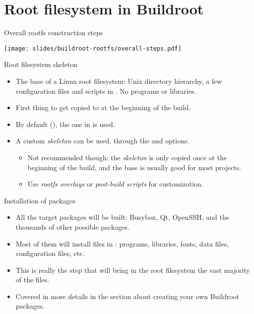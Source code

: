 
\section{Root filesystem in Buildroot}

\begin{frame}{Overall rootfs construction steps}
  \begin{center}
    \texttt{[image: slides/buildroot-rootfs/overall-steps.pdf]}
  \end{center}
\end{frame}

\begin{frame}{Root filesystem skeleton}
  \begin{itemize}
  \item The base of a Linux root filesystem: Unix directory hierarchy,
    a few configuration files and scripts in . No programs
    or libraries.
  \item First thing to get copied to  at the
    beginning of the build.
  \item By default (), the one in
     is used.
  \item A custom {\em skeleton} can be used, through the
     and
     options.
    \begin{itemize}
    \item Not recommended though: the {\em skeleton} is only copied
      once at the beginning of the build, and the base is usually good
      for most projects.
    \item Use {\em rootfs overlays} or {\em post-build scripts} for
      customization.
    \end{itemize}
  \end{itemize}
\end{frame}

\begin{frame}{Installation of packages}
  \begin{itemize}
  \item All the target packages will be built: Busybox, Qt, OpenSSH,
    and the thousands of other possible packages.
  \item Most of them will install files in :
    programs, libraries, fonts, data files, configuration files, etc.
  \item This is really the step that will bring in the root filesystem
    the vast majority of the files.
  \item Covered in more details in the section about creating your own
    Buildroot packages.
  \end{itemize}
\end{frame}

